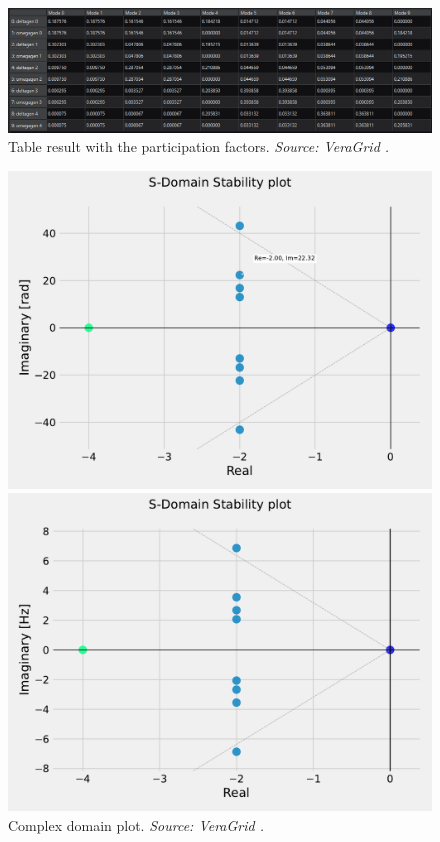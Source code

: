 \begin{figure}[H]
  \centering
  \includegraphics[width=1\linewidth]{figures/result_pfactors_GUI.png}
  \caption{Table result with the participation factors. \textit{Source: VeraGrid \cite{veragrid}.}}
  \label{fig:table_PF_GUI}
\end{figure}

\begin{figure}[H]
  \centering
  \begin{minipage}{0.49\textwidth}
    \centering
    \includegraphics[width=\linewidth]{figures/smallsignal_plot_GUI.pdf}
    \caption{Complex domain plot.  \textit{Source: VeraGrid \cite{veragrid}.}}
    \label{fig:plot_ss_GUI}
  \end{minipage}
  \hfill
  \begin{minipage}{0.49\textwidth}
    \centering
    \includegraphics[width=\linewidth]{figures/smallsignal_plot_Hz_GUI.pdf}

\end{minipage}
\end{figure}
